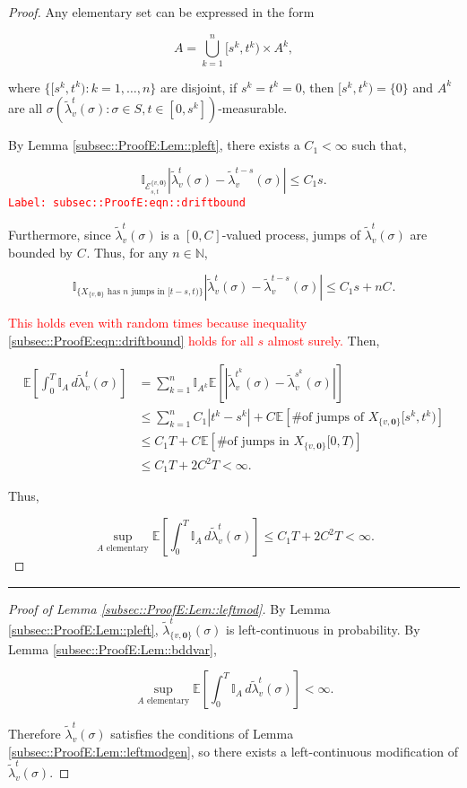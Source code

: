 \documentclass[12pt]{article}
\newcommand{\mb}{\mathbb}
\newcommand{\mc}{\mathcal}
\newcommand{\te}{\text}
\newcommand{\tr}{\textcolor{red}}
\newcommand{\labe}[1]{\tr{\texttt{Label: #1}}}
\newcommand{\lin}{\rule{\linewidth}{0.4 pt}}
\newcommand{\ex}[1]{\mb{E}\left[#1\right]}			%
\renewcommand{\root}{\mathbf{0}}				%
\renewcommand{\v}{v}							%
\renewcommand{\S}{S}							%
\newcommand{\s}{\sigma}							%
\newcommand{\T}{T}								%
\renewcommand{\t}{t}							%
\newcommand{\pup}[1]{^{#1}}							%
\renewcommand{\tt}{s}								%
\renewcommand{\it}{k}								%
\newcommand{\numb}{n}								%
\newcommand{\rxvts}[2]{X_{#1}{#2}}					%
\newcommand{\crate}[2]{\alt{\lambda}_{#1}^{#2}}		%
\newcommand{\const}[1]{C_{#1}}						%
\newcommand{\alt}{\widetilde}						%
\newcommand{\evnt}{\mc{E}}						%
\newcommand{\typset}{A}							%
\begin{document}
\begin{proof}
Any elementary set can be expressed in the form

\[\typset = \bigcup_{\it = 1}^\numb [\tt^\it,\t^\it)\times \typset\pup{\it},\]

where \(\{[\tt^\it,\t^\it):\it=1,\dots,\numb\}\) are disjoint, if \(\tt^\it = \t^\it = 0\), then \([\tt^\it,\t^\it) = \{0\}\) and \(\typset\pup{\it}\) are all \(\sigma(\crate{\v}{\t}(\s):\s \in \S,\t\in [0,\tt^\it])\)-measurable. 

By Lemma \ref{subsec::ProofE:Lem::pleft}, there exists a \(\const{1} < \infty\) such that,

\begin{equation}
\mb{I}_{\evnt^{\{\v,\root\}}_{\tt,\t}}|\crate{\v}{\t}(\s) - \crate{\v}{\t-\tt}(\s)| \leq \const{1}\tt.
\label{subsec::ProofE:eqn::driftbound}
\end{equation}
\labe{subsec::ProofE:eqn::driftbound}

Furthermore, since \(\crate{\v}{\t}(\s)\) is a \([0,\const{}]\)-valued process, jumps of \(\crate{\v}{\t}(\s)\) are bounded by \(\const{}\). Thus, for any \(\numb \in \mb{N}\),

\[\mb{I}_{\{\rxvts{\{\v,\root\}}{}\te{ has }\numb\te{ jumps in } [\t-\tt,\t)\}}|\crate{\v}{\t}(\s) - \crate{\v}{\t-\tt}(\s)|\leq C_1\tt + \numb \const{}.\]

\tr{This holds even with random times because inequality \eqref{subsec::ProofE:eqn::driftbound} holds for all \(\tt\) almost surely.} Then,

\begin{align*}
\ex{\int_0^\T \mb{I}_\typset\,d\crate{\v}{\t}(\s)} &= \sum_{\it = 1}^\numb \mb{I}_{\typset^\it}\ex{\left|\crate{\v}{\t^k}(\s) - \crate{\v}{\tt^k}(\s)\right|}\\
&\leq \sum_{\it=1}^\numb \const{1}|\t^\it - \tt^\it| + \const{}\ex{\te{\# of jumps of }\rxvts{\{\v,\root\}}{[\tt^\it,\t^\it)}}\\
&\leq \const{1}\T + \const{}\ex{\te{\# of jumps in }\rxvts{\{\v,\root\}}{[0,\T)}}\\
&\leq \const{1}\T + 2\const{}^2\T < \infty.
\end{align*}

Thus,

\[\sup_{\typset\te{ elementary}} \ex{\int_0^\T \mb{I}_\typset\,d\crate{\v}{\t}(\s)} \leq \const{1}\T + 2\const{}^2\T < \infty.\]
\end{proof}

\lin

\begin{proof}[Proof of Lemma \ref{subsec::ProofE:Lem::leftmod}]

By Lemma \ref{subsec::ProofE:Lem::pleft}, \(\crate{\{\v,\root\}}{\t}(\s)\) is left-continuous in probability. By Lemma \ref{subsec::ProofE:Lem::bddvar},

\[\sup_{\typset\te{ elementary}} \ex{\int_0^\T \mb{I}_{\typset}\,d\crate{\v}{\t}(\s)} < \infty.\]

Therefore \(\crate{\v}{\t}(\s)\) satisfies the conditions of Lemma \ref{subsec::ProofE:Lem::leftmodgen}, so there exists a left-continuous modification of \(\crate{\v}{\t}(\s)\).
\end{proof}
\end{document}
